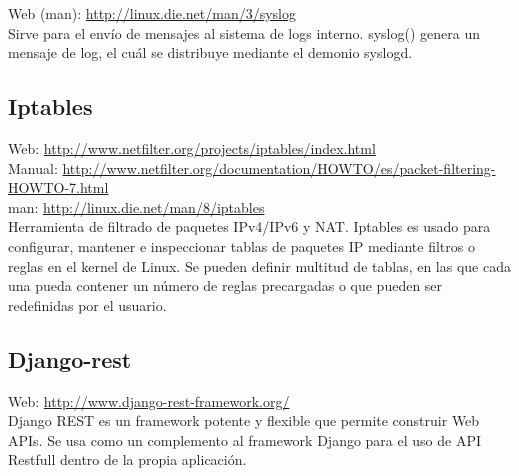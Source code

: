 Web (man): \url{http://linux.die.net/man/3/syslog}\\

Sirve para el envío de mensajes al sistema de logs interno. syslog() genera un mensaje de log, el cuál se distribuye mediante el demonio syslogd.

\subsection{Iptables}

Web: \url{http://www.netfilter.org/projects/iptables/index.html}\\
Manual: \url{http://www.netfilter.org/documentation/HOWTO/es/packet-filtering-HOWTO-7.html}\\
man: \url{http://linux.die.net/man/8/iptables}\\

Herramienta de filtrado de paquetes IPv4/IPv6 y NAT. Iptables es usado para configurar, mantener e inspeccionar tablas de paquetes IP mediante filtros o reglas en el kernel de Linux. Se pueden definir multitud de tablas, en las que cada una pueda contener un número de reglas precargadas o que pueden ser redefinidas por el usuario. \\

\subsection{Django-rest}


Web: \url{http://www.django-rest-framework.org/}\\

Django REST es un framework potente y flexible que permite construir Web APIs. Se usa como un complemento al framework Django para el uso de API Restfull dentro de la propia aplicación.

